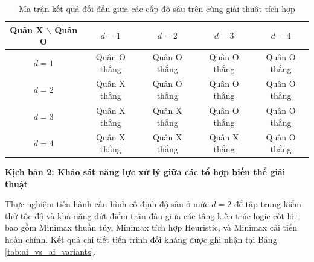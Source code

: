 \begin{table}[!htbp]
	\centering
	\renewcommand{\arraystretch}{1.25}
	\caption{Ma trận kết quả đối đầu giữa các cấp độ sâu trên cùng giải thuật tích hợp}
	\label{tab:ai_vs_ai_depth}
	\begin{tabular}{|c|c|c|c|c|}
		\hline
		\textbf{Quân X $\backslash$ Quân O} & \textbf{$d = 1$} & \textbf{$d = 2$} & \textbf{$d = 3$} & \textbf{$d = 4$} \\ \hline
		\textbf{$d = 1$} & Quân O thắng & Quân O thắng & Quân O thắng & Quân O thắng \\ \hline
		\textbf{$d = 2$} & Quân X thắng & Quân O thắng & Quân O thắng & Quân O thắng \\ \hline
		\textbf{$d = 3$} & Quân X thắng & Quân X thắng & Quân O thắng & Quân O thắng \\ \hline
		\textbf{$d = 4$} & Quân X thắng & Quân X thắng & Quân X thắng & Quân O thắng \\ \hline
	\end{tabular}
\end{table}

\textbf{Kịch bản 2: Khảo sát năng lực xử lý giữa các tổ hợp biến thể giải thuật}

Thực nghiệm tiến hành cấu hình cố định độ sâu ở mức $d=2$ để tập trung kiểm thử tốc độ và khả năng dứt điểm trận đấu giữa các tầng kiến trúc logic cốt lõi bao gồm Minimax thuần túy, Minimax tích hợp Heuristic, và Minimax cải tiến hoàn chỉnh. Kết quả chi tiết tiến trình đối kháng được ghi nhận tại Bảng \ref{tab:ai_vs_ai_variants}.

